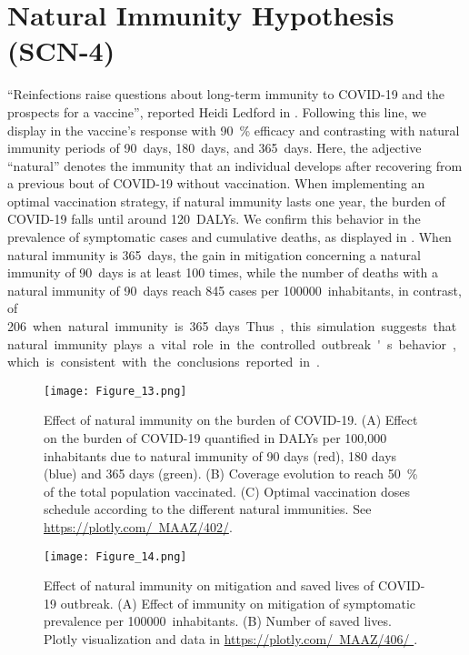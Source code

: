 \section*{Natural Immunity Hypothesis (SCN-4)}
%
     ``Reinfections raise questions about long-term immunity to
     COVID-19 and the prospects for a vaccine'',  reported
    Heidi Ledford in \cite{Ledford2020b}. Following this line, we
    display in 
    the vaccine's response with \SI{90}{\percent} efficacy and
    contrasting with  natural immunity periods of \SI{90}{days},
    \SI{180}{days}, and \SI{365}{days}. Here, the adjective ``natural''
    denotes the immunity that an individual develops after recovering from a
    previous bout of COVID-19 without vaccination.
    When implementing an optimal vaccination strategy, if natural
    immunity lasts one year, the burden of COVID-19 falls until around
    \SI{120}{DALYs}. We confirm this behavior in the prevalence of symptomatic
    cases and cumulative deaths, as displayed in
    . When natural immunity is
    \SI{365}{days}, the gain in mitigation concerning a natural immunity of
    \SI{90}{days} is at least \num{100} times, while the number of deaths
    with a natural immunity of \SI{90}{days} reach \num{845} cases per
    \SI{100000}{inhabitants}, in contrast, of \SI{206} when natural immunity is
    \SI{365}{days}. Thus, this simulation suggests that natural immunity
    plays a vital role in the controlled outbreak's behavior, which is
    consistent with the conclusions reported in \cite{Jeyanathan2020}.
%
    \begin{figure*}[tbh!]
        \centering
        \texttt{[image: Figure\_13.png]}
        \caption[Effect of natural immunity on the burden of COVID-19]{
            Effect of natural immunity on the burden of COVID-19.
            (A) Effect on the burden of COVID-19 quantified in DALYs per
            100,000 inhabitants due to natural immunity of 90 days (red),
            180 days (blue) and 365 days (green).
            (B) Coverage evolution to reach \SI{50}{\percent} of the total
            population vaccinated.
            (C) Optimal vaccination doses schedule according to the different
            natural immunities. See
            \href{https://plotly.com/~MAAZ/402/}{%
                https://plotly.com/~MAAZ/402/}.
        }
        \label{fig:natural_recovering_profile}
    \end{figure*}
%
    \begin{figure*}[h!]
        \centering
        \texttt{[image: Figure\_14.png]}
        \caption[Vaccine induced immunity profile.]{
            Effect of natural immunity on mitigation and saved lives of
            COVID-19 outbreak.
            (A) Effect of  immunity on mitigation of
            symptomatic prevalence per \SI{100000}{inhabitants}.
            (B) Number of saved lives. Plotly visualization and data in
            \href{https://plotly.com/~MAAZ/406/}{%
                https://plotly.com/~MAAZ/406/
            }.
        }
        \label{fig:natural_recovering_outbreak}
    \end{figure*}